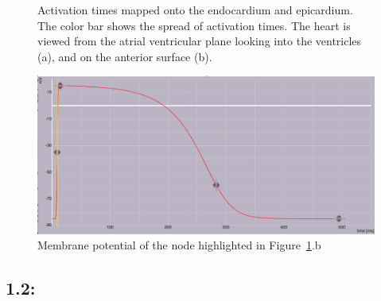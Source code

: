 \documentclass[12pt]{article}
\begin{document}
\begin{figure}[H]
\begin{subfigure}{.5\textwidth}
	\end{subfigure}
	\caption{Activation times mapped onto the endocardium and epicardium. The color bar shows the spread of activation times. The heart is viewed from the atrial ventricular plane looking into the ventricles (a), and on the anterior surface (b).}
	\label{1_1_actTimes}
\end{figure}

\begin{figure}[H]
	\centering
	\includegraphics[width=.95\linewidth]{Figures/1_1_actpotential.png}

	\caption{Membrane potential of the node highlighted in Figure~\ref{1_1_actTimes}.b}
	\label{1_1_vm}
\end{figure}

\subsection{1.2: }
\end{document}
